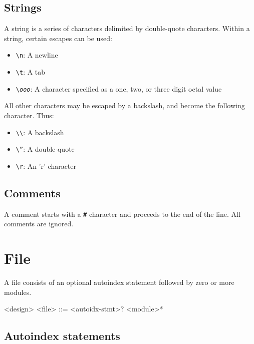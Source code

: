 \subsection{Strings}

A string is a series of characters delimited by double-quote characters. Within a string, certain escapes can be used:

\begin{itemize}
    \item \texttt{\textbackslash n}: A newline
    \item \texttt{\textbackslash t}: A tab
    \item \texttt{\textbackslash \textit{ooo}}: A character specified as a one, two, or three digit octal value
\end{itemize}

All other characters may be escaped by a backslash, and become the following character. Thus:

\begin{itemize}
    \item \texttt{\textbackslash \textbackslash}: A backslash
    \item \texttt{\textbackslash ''}: A double-quote
    \item \texttt{\textbackslash r}: An 'r' character
\end{itemize}

\subsection{Comments}

A comment starts with a \texttt{\textbf{\#}} character and proceeds to the end of the line. All comments are ignored.

\section{File}

A file consists of an optional autoindex statement followed by zero or more modules.

\begin{indentgrammar}{<design>}
<file> ::= <autoidx-stmt>$?$ <module>*
\end{indentgrammar}

\subsection{Autoindex statements}


